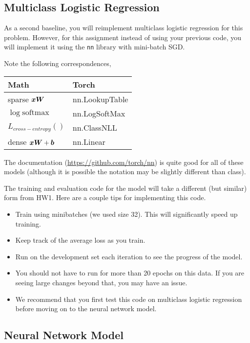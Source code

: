 \documentclass[11pt]{article}
\begin{document}
\subsection{Multiclass Logistic Regression}

As a second baseline, you will reimplement multiclass logistic
regression for this problem. However, for this assignment instead of
using your previous code, you will implement it using the \texttt{nn}
library with mini-batch SGD.



Note the following correspondences,

\begin{center}
  \begin{tabular}{ll}
    \toprule
    Math & Torch \\
    \midrule 
    sparse $\boldsymbol{x} \boldsymbol{W}$ & nn.LookupTable \\ 
    $\log \mathrm{softmax}$ & nn.LogSoftMax \\ 
    $L_{cross-entropy}()$ & nn.ClassNLL \\ 
    dense $\boldsymbol{x} \boldsymbol{W} + \boldsymbol{b}$ & nn.Linear \\ 
    \bottomrule
  \end{tabular}
\end{center}
The documentation (\url{https://github.com/torch/nn}) is quite good
for all of these models (although it is possible the notation may be
slightly different than class).

The training and evaluation code for the model will take a different (but similar) form 
from HW1. Here are a couple tips for implementing this code. 
 
 \begin{itemize}
 \item Train using minibatches (we used size 32). This will significantly speed up training. 
 \item Keep track of the average loss as you train. 
 \item Run on the development set each iteration to see the progress of the model.
 \item You should not have to run for more than 20 epochs on this data. If you are seeing large 
   changes beyond that, you may have an issue. 
 \item We recommend that you first test this code on multiclass
   logistic regression before moving on to the neural network model.
 \end{itemize}

\subsection{Neural Network Model}
\end{document}
